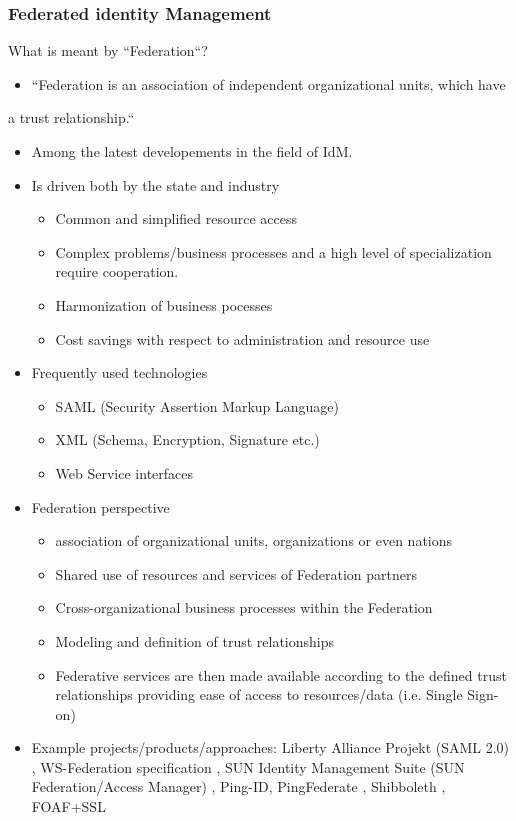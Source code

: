 \documentclass[11pt]{article}
\begin{document}
\subsubsection{Federated identity Management}
\label{sec:org263110a}
What is meant by “Federation“?
\begin{itemize}
\item “Federation is an association of independent organizational units, which have
\end{itemize}
a trust relationship.“
\begin{itemize}
\item Among the latest developements in the field of IdM.
\item Is driven both by the state and industry
\begin{itemize}
\item Common and simplified resource access
\item Complex problems/business processes and a high level of specialization require cooperation.
\item Harmonization of business pocesses
\item Cost savings with respect to administration and resource use
\end{itemize}
\item Frequently used technologies
\begin{itemize}
\item SAML (Security Assertion Markup Language)
\item XML (Schema, Encryption, Signature etc.)
\item Web Service interfaces
\end{itemize}
\item Federation perspective
\begin{itemize}
\item association of organizational units, organizations or even nations
\item Shared use of resources and services of Federation partners
\item Cross-organizational business processes within the Federation
\item Modeling and definition of trust relationships
\item Federative services are then made available according to the defined trust relationships providing ease of access to resources/data (i.e. Single Sign-on)
\end{itemize}
\item Example projects/products/approaches: Liberty Alliance Projekt (SAML 2.0) , WS-Federation specification , SUN Identity Management Suite (SUN Federation/Access Manager) , Ping-ID, PingFederate , Shibboleth , FOAF+SSL
\end{itemize}
\end{document}
